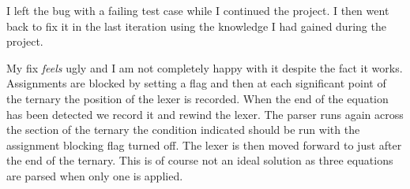 I left the bug with a failing test case while I continued the project.
I then went back to fix it in the last iteration using the knowledge I had gained during the project.

My fix \textit{feels} ugly and I am not completely happy with it despite the fact it works.
Assignments are blocked by setting a flag and then at each significant point of the ternary the position of the lexer is recorded.
When the end of the equation has been detected we record it and rewind the lexer.
The parser runs again across the section of the ternary the condition indicated should be run with the assignment blocking flag turned off.
The lexer is then moved forward to just after the end of the ternary.
This is of course not an ideal solution as three equations are parsed when only one is applied.












